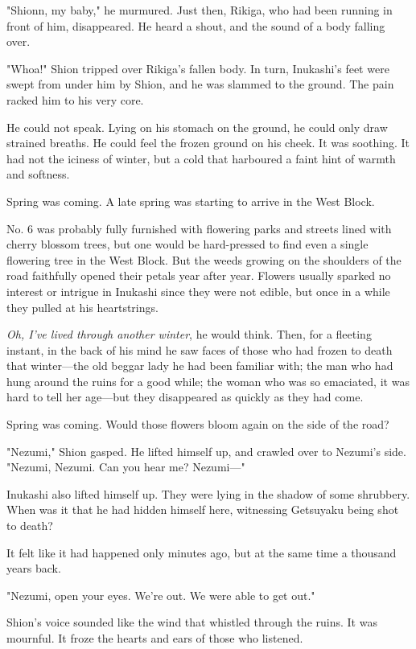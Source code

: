 "Shionn, my baby," he murmured. Just then, Rikiga, who had been running
in front of him, disappeared. He heard a shout, and the sound of a body
falling over.

"Whoa!" Shion tripped over Rikiga's fallen body. In turn, Inukashi's
feet were swept from under him by Shion, and he was slammed to the
ground. The pain racked him to his very core.

He could not speak. Lying on his stomach on the ground, he could only
draw strained breaths. He could feel the frozen ground on his cheek. It
was soothing. It had not the iciness of winter, but a cold that
harboured a faint hint of warmth and softness.

Spring was coming. A late spring was starting to arrive in the West
Block.

No. 6 was probably fully furnished with flowering parks and streets
lined with cherry blossom trees, but one would be hard-pressed to find
even a single flowering tree in the West Block. But the weeds growing on
the shoulders of the road faithfully opened their petals year after
year. Flowers usually sparked no interest or intrigue in Inukashi since
they were not edible, but once in a while they pulled at his
heartstrings.

\emph{Oh, I've lived through another winter}, he would think. Then, for a
fleeting instant, in the back of his mind he saw faces of those who had
frozen to death that winter---the old beggar lady he had been familiar
with; the man who had hung around the ruins for a good while; the woman
who was so emaciated, it was hard to tell her age---but they disappeared
as quickly as they had come.

Spring was coming. Would those flowers bloom again on the side of the
road?

"Nezumi," Shion gasped. He lifted himself up, and crawled over to
Nezumi's side. "Nezumi, Nezumi. Can you hear me? Nezumi---"

Inukashi also lifted himself up. They were lying in the shadow of some
shrubbery. When was it that he had hidden himself here, witnessing
Getsuyaku being shot to death?

It felt like it had happened only minutes ago, but at the same time a
thousand years back.

"Nezumi, open your eyes. We're out. We were able to get out."

Shion's voice sounded like the wind that whistled through the ruins. It
was mournful. It froze the hearts and ears of those who listened.

